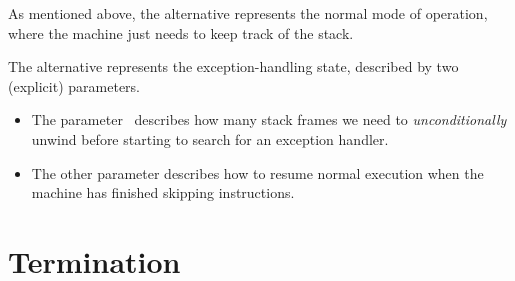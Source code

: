 \noindent As mentioned above, the alternative \ident{\tick[\_]} represents the normal mode
of operation, where the machine just needs to keep track of the stack.

The alternative \ident{$\times$[\_,\_]} represents the exception-handling state, described by
two (explicit) parameters.
\begin{itemize}
	\item The parameter~ describes how many stack frames we need to
		\emph{unconditionally} unwind before starting to search for an exception handler.
	\item The other parameter describes how to resume normal execution when
		the machine has finished skipping instructions.
\end{itemize}





\section{Termination}




































































